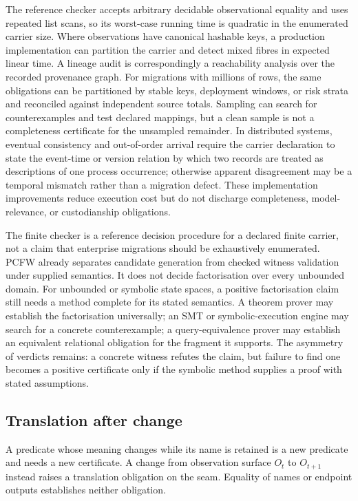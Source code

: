 \documentclass[twocolumn,envcountsect,envcountsame,natbib]{svjour3}
\begin{document}
The reference checker accepts arbitrary decidable observational equality and uses repeated list scans, so its worst-case running time is quadratic in the enumerated carrier size. Where observations have canonical hashable keys, a production implementation can partition the carrier and detect mixed fibres in expected linear time. A lineage audit is correspondingly a reachability analysis over the recorded provenance graph. For migrations with millions of rows, the same obligations can be partitioned by stable keys, deployment windows, or risk strata and reconciled against independent source totals. Sampling can search for counterexamples and test declared mappings, but a clean sample is not a completeness certificate for the unsampled remainder. In distributed systems, eventual consistency and out-of-order arrival require the carrier declaration to state the event-time or version relation by which two records are treated as descriptions of one process occurrence; otherwise apparent disagreement may be a temporal mismatch rather than a migration defect. These implementation improvements reduce execution cost but do not discharge completeness, model-relevance, or custodianship obligations.

The finite checker is a reference decision procedure for a declared finite carrier, not a claim that enterprise migrations should be exhaustively enumerated. PCFW already separates candidate generation from checked witness validation under supplied semantics. It does not decide factorisation over every unbounded domain. For unbounded or symbolic state spaces, a positive factorisation claim still needs a method complete for its stated semantics. A theorem prover may establish the factorisation universally; an SMT or symbolic-execution engine may search for a concrete counterexample; a query-equivalence prover may establish an equivalent relational obligation for the fragment it supports. The asymmetry of verdicts remains: a concrete witness refutes the claim, but failure to find one becomes a positive certificate only if the symbolic method supplies a proof with stated assumptions.

\subsection{Translation after change}\label{ex:sec:debt-extensions}

A predicate whose meaning changes while its name is retained is a new predicate and needs a new certificate. A change from observation surface $O_t$ to $O_{t+1}$ instead raises a translation obligation on the seam. Equality of names or endpoint outputs establishes neither obligation.
\end{document}
